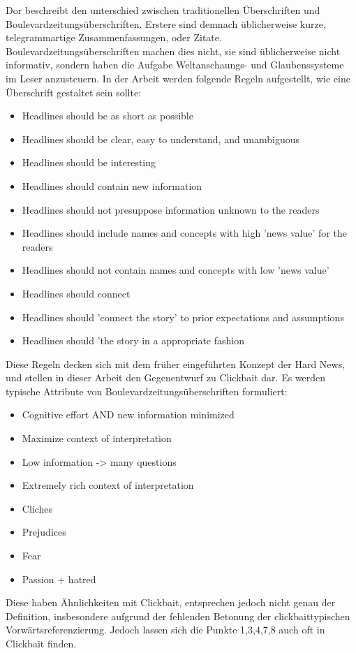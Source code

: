 Dor beschreibt den unterschied zwischen traditionellen Überschriften und Boulevardzeitungsüberschriften. Erstere sind demnach üblicherweise kurze, telegrammartige Zusammenfassungen, oder Zitate. Boulevardzeitungsüberschriften machen dies nicht, sie sind üblicherweise nicht informativ, sondern haben die Aufgabe Weltanschaungs- und Glaubenssysteme im Leser anzusteuern. In der Arbeit werden folgende Regeln aufgestellt, wie eine Überschrift gestaltet sein sollte:
\begin{itemize}
\item Headlines should be as short as possible
\item Headlines should be clear, easy to understand, and unambiguous
\item Headlines should be interesting
\item Headlines should contain new information
\item Headlines should not presuppose information unknown to the readers
\item Headlines should include names and concepts with high 'news value' for the readers
\item Headlines should not contain names and concepts with low 'news value'
\item Headlines should connect
\item Headlines should 'connect the story' to prior expectations and assumptions
\item Headlines should 'the story in a appropriate fashion
\end{itemize}
Diese Regeln decken sich mit dem früher eingeführten Konzept der Hard News, und stellen in dieser Arbeit den Gegenentwurf zu Clickbait dar. 
Es werden typische Attribute von Boulevardzeitungsüberschriften formuliert:
\begin{itemize}
\item Cognitive effort AND new information minimized
\item Maximize context of interpretation
\item Low information -> many questions
\item Extremely rich context of interpretation 
\item Cliches
\item Prejudices
\item Fear
\item Passion + hatred
\end{itemize}
Diese haben Ähnlichkeiten mit Clickbait, entsprechen jedoch nicht genau der Definition, insbesondere aufgrund der fehlenden Betonung der clickbaittypischen Vorwärtsreferenzierung. Jedoch lassen sich die Punkte 1,3,4,7,8 auch oft in Clickbait finden.


